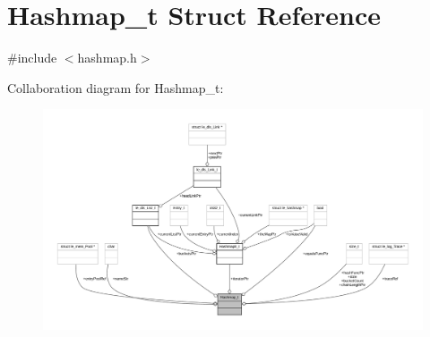 \hypertarget{struct_hashmap__t}{}\section{Hashmap\+\_\+t Struct Reference}
\label{struct_hashmap__t}


{\ttfamily \#include $<$hashmap.\+h$>$}



Collaboration diagram for Hashmap\+\_\+t\+:
\nopagebreak
\begin{figure}[H]
\begin{center}
\leavevmode
\includegraphics[width=350pt]{struct_hashmap__t__coll__graph}
\end{center}
\end{figure}
